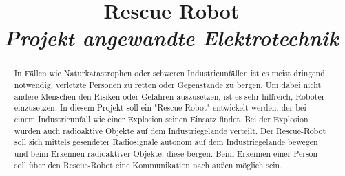 \documentclass[conference,compsoc]{IEEEtran}
\begin{document}
%
\title{Rescue Robot\\ \textit{Projekt angewandte Elektrotechnik}}


\author{
\and
{}
\and
{}
}


\maketitle

\begin{abstract}
In Fällen wie Naturkatastrophen oder schweren Industrieunfällen ist es meist dringend notwendig, verletzte Personen zu retten oder Gegenstände zu bergen. Um dabei nicht andere Menschen den Risiken oder Gefahren auszusetzen, ist es sehr hilfreich, Roboter einzusetzen. In diesem Projekt soll ein "Rescue-Robot" entwickelt werden, der bei einem Industrieunfall wie einer Explosion seinen Einsatz findet. Bei der Explosion wurden auch radioaktive Objekte auf dem Industriegelände verteilt. Der Rescue-Robot soll sich mittels gesendeter Radiosignale autonom auf dem Industriegelände bewegen und beim Erkennen radioaktiver Objekte, diese bergen. Beim Erkennen einer Person soll über den Rescue-Robot eine Kommunikation nach außen möglich sein.
\end{abstract}
\end{document}
